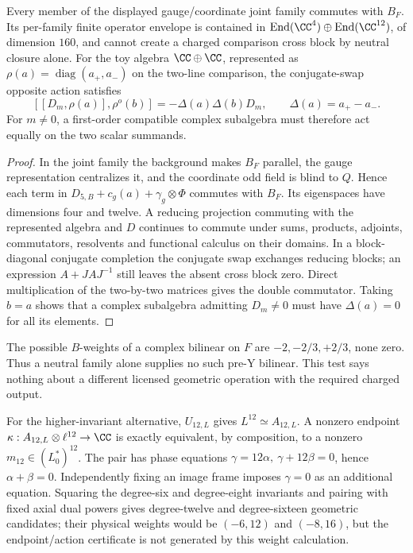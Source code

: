 \documentclass[12pt,a4paper]{article}
\begin{document}
\begin{proposition}
\label{p5:prop:neutral-joint-word-comparison-boundary}
Every member of the displayed gauge/coordinate joint family
commutes with \(B_F\).  Its per-family finite operator
envelope is contained in
\(\operatorname{End}(\CC^4)\oplus\operatorname{End}(\CC^{12})\),
of dimension \(160\), and cannot create a charged comparison
cross block by neutral closure alone.
For the toy algebra \(\CC\oplus\CC\), represented as
\(\rho(a)=\operatorname{diag}(a_+,a_-)\) on the
two-line comparison, the conjugate-swap opposite action
satisfies
\[
 [[D_m,\rho(a)],\rho^o(b)]
     =-\Delta(a)\Delta(b)D_m,\qquad
 \Delta(a)=a_+-a_-.
\]
For \(m\ne0\), a first-order compatible complex subalgebra
must therefore act equally on the two scalar summands.
\end{proposition}
\begin{proof}
In the joint family the background makes \(B_F\) parallel,
the gauge representation centralizes it, and the coordinate
odd field is blind to \(Q\).  Hence each term in
\(D_{5,B}+c_g(a)+\gamma_g\otimes\Phi\) commutes with \(B_F\).
Its eigenspaces have dimensions four and twelve.
A reducing projection commuting with the represented
algebra and \(D\) continues to commute under sums,
products, adjoints, commutators, resolvents and functional
calculus on their domains.  In a block-diagonal conjugate
completion the conjugate swap exchanges reducing blocks;
an expression \(A+JAJ^{-1}\) still leaves the absent cross
block zero.  Direct multiplication of the two-by-two
matrices gives the double commutator.  Taking \(b=a\)
shows that a complex subalgebra admitting \(D_m\ne0\)
must have \(\Delta(a)=0\) for all its elements.
\end{proof}

The possible \(B\)-weights of a complex bilinear on \(F\)
are \(-2,-2/3,+2/3\), none zero.  Thus a neutral family
alone supplies no such pre-Y bilinear.  This test says
nothing about a different licensed geometric operation
with the required charged output.

For the higher-invariant alternative, \(U_{12,L}\) gives
\(L^{12}\simeq A_{12,L}\).  A nonzero endpoint
\(\kappa:A_{12,L}\otimes\ell^{12}\to\CC\) is exactly
equivalent, by composition, to a nonzero
\(m_{12}\in(L_0^*)^{12}\).
The pair has phase equations
\(\gamma=12\alpha,\ \gamma+12\beta=0\), hence
\(\alpha+\beta=0\).  Independently fixing an image
frame imposes \(\gamma=0\) as an additional equation.
Squaring the degree-six and degree-eight invariants
and pairing with fixed axial dual powers gives
degree-twelve and degree-sixteen geometric candidates;
their physical weights would be \((-6,12)\) and
\((-8,16)\), but the endpoint/action certificate is
not generated by this weight calculation.
\end{document}
